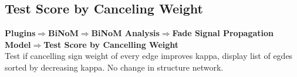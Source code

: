 \subsection{Test Score by Canceling Weight }
\textbf{Plugins$\Rightarrow$BiNoM$\Rightarrow$BiNoM Analysis$\Rightarrow$Fade Signal Propagation Model$\Rightarrow$Test Score by Cancelling Weight}\\
Test if cancelling sign weight of every edge improves kappa, display list of egdes sorted by decreasing kappa. No change in structure network.




